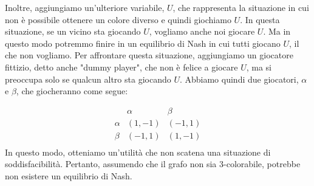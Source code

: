 Inoltre, aggiungiamo un'ulteriore variabile, $U$, che rappresenta la situazione
in cui non è possibile ottenere un colore diverso e quindi giochiamo $U$. In
questa situazione, se un vicino sta giocando $U$, vogliamo anche noi giocare
$U$. Ma in questo modo potremmo finire in un equilibrio di Nash in cui tutti
giocano $U$, il che non vogliamo. Per affrontare questa situazione, aggiungiamo
    un giocatore fittizio, detto anche "dummy player", che non è felice a giocare
$U$, ma si preoccupa solo se qualcun altro sta giocando $U$. Abbiamo quindi due
    giocatori, $\alpha$ e $\beta$, che giocheranno come segue:

\[
    \begin{array}{ccc}
               & \alpha & \beta  \\
        \alpha & (1,-1) & (-1,1) \\
        \beta  & (-1,1) & (1,-1) \\
    \end{array}
\]
In questo modo, otteniamo un'utilità che non scatena una situazione di
soddisfacibilità. Pertanto, assumendo che il grafo non sia 3-colorabile,
potrebbe non esistere un equilibrio di Nash.

\newpage